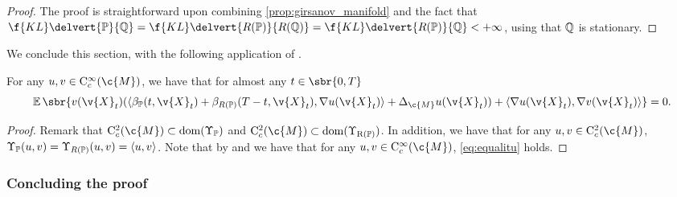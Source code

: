 \begin{proof}
	The proof is straightforward upon combining \cref{prop:girsanov_manifold} and the fact that \(\f{KL}\delvert{\bb{P}}{\bb{Q}} = \f{KL}\delvert{R(\bb{P})}{R(\bb{Q})} = \f{KL}\delvert{R(\bb{P})}{\bb{Q}} < +\infty\), using that \(\bb{Q}\) is stationary.
\end{proof}

We conclude this section, with the following application of .

\begin{proposition}
	\label{prop:cattiaux_spec}
	For any \(u, v \in \mathrm{C}^\infty_c(\c{M})\), we have that for almost any \(t \in \sbr{0,T}\) \begin{equation} \label{eq:equalitu} \E\sbr{v(\v{X}_t) (\langle \beta_{\bb{P}}(t, \v{X}_t) + \beta_{R(\bb{P})}(T-t, \v{X}_t), \nabla u(\v{X}_t) \rangle +\Delta_\c{M} u(\v{X}_t)) + \langle \nabla u(\v{X}_t), \nabla v(\v{X}_t) \rangle} = 0 .
	\end{equation}
\end{proposition}

\begin{proof}
	Remark that \(\mathrm{C}^2_c(\c{M}) \subset \rm{dom}(\carrechamp_{\bb{P}})\) and \(\mathrm{C}^2_c(\c{M}) \subset \rm{dom}(\carrechamp_{R(\bb{P})})\).
	In addition, we have that for any \(u,v \in \mathrm{C}^2_c(\c{M})\), \(\carrechamp_{\bb{P}}(u,v) = \carrechamp_{R(\bb{P})}(u,v) = \langle u, v \rangle\).
	Note that by  and  we have that for any \(u, v \in \mathrm{C}^\infty_c(\c{M})\), \eqref{eq:equalitu} holds.
\end{proof}
\subsubsection{Concluding the proof}
\label{sec:concluding-proof}

